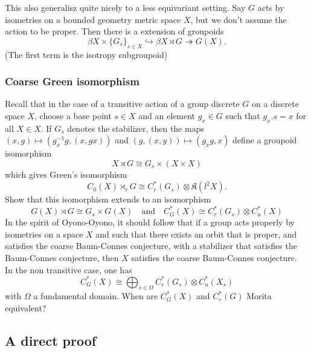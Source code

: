 This also generalisz quite nicely to a less equivariant setting. Say $G$ acts by isometries on a bounded geometry metric space $X$, but we don't assume the action to be proper. Then there is a extension of groupoids
\[ \beta X \times \{G_s\}_{s\in X} \hookrightarrow  \beta X \rtimes G \twoheadrightarrow G(X).\]
(The first term is the isotropy subgroupoid)

\subsubsection*{Coarse Green isomorphism}

Recall that in the case of a transitive action of a group discrete $G$ on a discrete space $X$, choose a base point $s\in X$ and an element $g_x\in G$ such that $g_x .s =x$ for all $X\in X$. If $G_s$ denotes the stabilizer, then the maps $(x,g)\mapsto (g^{-1}_x g , (x , gx))$ and $(g, (x,y))\mapsto (g_x g, x) $ define a groupoid isomorphism
\[ X\rtimes G \cong G_s \times (X\times X)\]
which gives Green's isomorphism
\[C_0(X)\rtimes_r G \cong C^*_r(G_s) \otimes \mathfrak K(l^2 X).\]
Show that this isomorphism extends to an isomorphism
\[G(X)\rtimes G \cong G_s \times G(X) \quad \text{and} \quad 
C^*_G(X) \cong C_r^*(G_s) \otimes C^*_u(X)\]
In the spirit of Oyono-Oyono, it should follow that if a group acts properly by isometries on a space $X$ and such that there exists an orbit that is proper, and satisfies the coarse Baum-Connes conjecture, with a stabilizer that satisfies the Baum-Connes conjecture, then $X$ satisfies the coarse Baum-Connes conjecture. \\ 

In the non  transitive case, one has
\[ C^*_G(X) \cong \bigoplus_{s\in \Omega} C_r^*(G_s) \otimes C^*_u(X_s)\]
with $\Omega$ a fundamental domain. When are $C_G^*(X)$ and $C^*_r(G)$ Morita equivalent?

\subsection{A direct proof}

